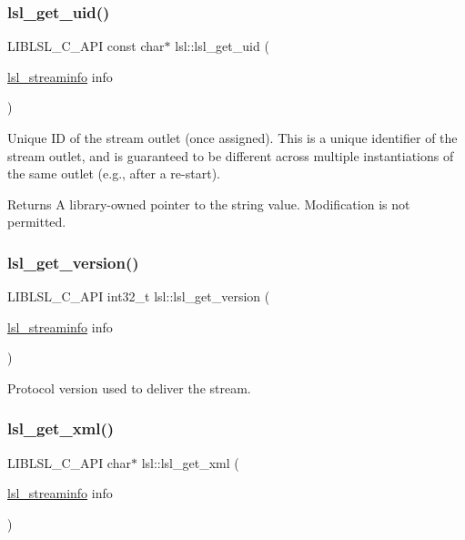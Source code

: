 \subsubsection{\texorpdfstring{lsl\+\_\+get\+\_\+uid()}{lsl\_get\_uid()}}
{\footnotesize\ttfamily L\+I\+B\+L\+S\+L\+\_\+\+C\+\_\+\+A\+PI const char$\ast$ lsl\+::lsl\+\_\+get\+\_\+uid (\begin{DoxyParamCaption}\item[{\hyperlink{namespacelsl_aa0a9ce9956061679949daa2e35aae2e8}{lsl\+\_\+streaminfo}}]{info }\end{DoxyParamCaption})}

Unique ID of the stream outlet (once assigned). This is a unique identifier of the stream outlet, and is guaranteed to be different across multiple instantiations of the same outlet (e.\+g., after a re-\/start). \begin{DoxyReturn}{Returns}
A library-\/owned pointer to the string value. Modification is not permitted. 
\end{DoxyReturn}
\mbox{\label{namespacelsl_ab889dd6f9a5fc6d6cd01a0b3dc153387}} 
\subsubsection{\texorpdfstring{lsl\+\_\+get\+\_\+version()}{lsl\_get\_version()}}
{\footnotesize\ttfamily L\+I\+B\+L\+S\+L\+\_\+\+C\+\_\+\+A\+PI int32\+\_\+t lsl\+::lsl\+\_\+get\+\_\+version (\begin{DoxyParamCaption}\item[{\hyperlink{namespacelsl_aa0a9ce9956061679949daa2e35aae2e8}{lsl\+\_\+streaminfo}}]{info }\end{DoxyParamCaption})}

Protocol version used to deliver the stream. \mbox{\label{namespacelsl_ad1a9b14dccf565e5ecb79c093fe0fd39}} 
\subsubsection{\texorpdfstring{lsl\+\_\+get\+\_\+xml()}{lsl\_get\_xml()}}
{\footnotesize\ttfamily L\+I\+B\+L\+S\+L\+\_\+\+C\+\_\+\+A\+PI char$\ast$ lsl\+::lsl\+\_\+get\+\_\+xml (\begin{DoxyParamCaption}\item[{\hyperlink{namespacelsl_aa0a9ce9956061679949daa2e35aae2e8}{lsl\+\_\+streaminfo}}]{info }\end{DoxyParamCaption})}

